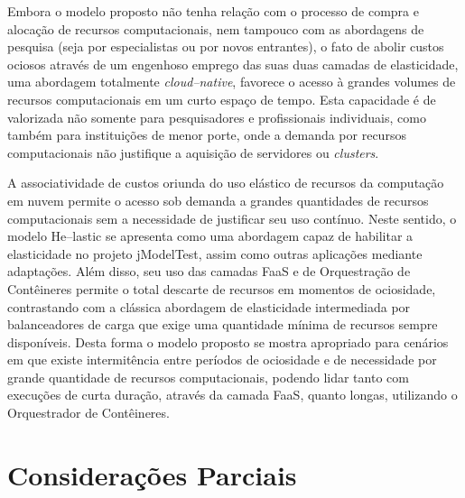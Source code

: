 \documentclass[english,brazilian]{UNISINOSmonografia} %
\begin{document}
Embora o modelo proposto não tenha relação com o processo de compra e alocação de recursos computacionais, nem tampouco com as abordagens de pesquisa (seja por especialistas ou por novos entrantes), o fato de abolir custos ociosos através de um engenhoso emprego das suas duas camadas de elasticidade, uma abordagem totalmente \textit{cloud--native}, favorece o acesso à grandes volumes de recursos computacionais em um curto espaço de tempo.
%
Esta capacidade é de valorizada não somente para pesquisadores e profissionais individuais, como também para instituições de menor porte, onde a demanda por recursos computacionais não justifique a aquisição de servidores ou \textit{clusters}.




A associatividade de custos oriunda do uso elástico de recursos da computação em nuvem permite o acesso sob demanda a grandes quantidades de recursos computacionais sem a necessidade de justificar seu uso contínuo.
%
Neste sentido, o modelo \textsf{He}--lastic se apresenta como uma abordagem capaz de habilitar a elasticidade no projeto jModelTest, assim como outras aplicações mediante adaptações.
%
Além disso, seu uso das camadas FaaS e de Orquestração de Contêineres permite o total descarte de recursos em momentos de ociosidade, contrastando com a clássica abordagem de elasticidade intermediada por balanceadores de carga que exige uma quantidade mínima de recursos sempre disponíveis.
%
Desta forma o modelo proposto se mostra apropriado para cenários em que existe intermitência entre períodos de ociosidade e de necessidade por grande quantidade de recursos computacionais, podendo lidar tanto com execuções de curta duração, através da camada FaaS, quanto longas, utilizando o Orquestrador de Contêineres.



%
%




\section{Considerações Parciais}
\end{document}
